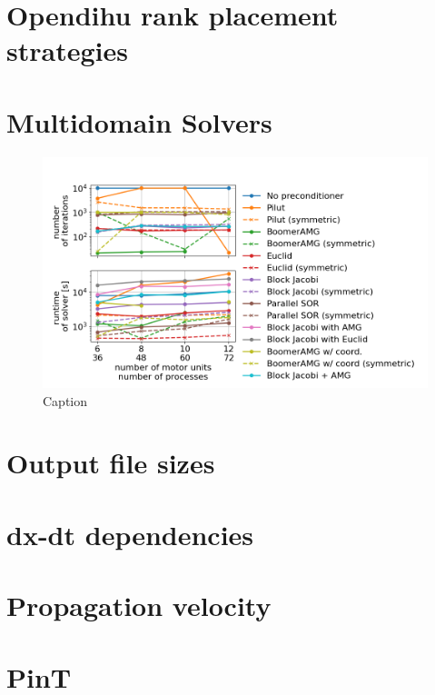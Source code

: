 \section{Opendihu rank placement strategies}

\section{Multidomain Solvers}

\begin{figure}[H]%
  \centering%
  \includegraphics[width=\textwidth]{images/results/studies/multidomain_solvers_all.png}%
  \caption{Caption}%
  \label{fig:fig1}%
\end{figure}
\section{Output file sizes}
\section{dx-dt dependencies}
\section{Propagation velocity}

\section{PinT}
